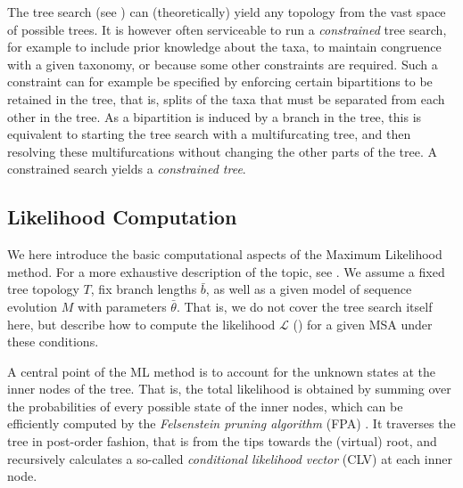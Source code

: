 The tree search (see )
can (theoretically) yield any topology from the vast space of possible trees.
It is however often serviceable to run a \emph{constrained} tree search,
for example to include prior knowledge about the taxa,
to maintain congruence with a given taxonomy, or because some other constraints are required.
Such a constraint can for example be specified by enforcing certain bipartitions to be retained in the tree,
that is, splits of the taxa that must be separated from each other in the tree.
As a bipartition is induced by a branch in the tree,
this is equivalent to starting the tree search with a multifurcating tree,
and then resolving these multifurcations without changing the other parts of the tree.
A constrained search yields a \emph{constrained tree}.



\subsection{Likelihood Computation}
\label{ch:Foundations:sec:MLTreeInference:sub:LikelihoodComputation}

We here introduce the basic computational aspects of the Maximum Likelihood method.
For a more exhaustive description of the topic, see \cite{Yang2014}.
We assume a fixed tree topology $T$, fix branch lengths $\bar{b}$,
as well as a given model of sequence evolution $M$ with parameters $\bar{\theta}$.
That is, we do not cover the tree search itself here,
but describe how to compute the likelihood $\mathcal{L}$
() for a given MSA under these conditions.

A central point of the ML method is to account for the unknown states at the inner nodes of the tree.
That is, the total likelihood is obtained by summing over the probabilities of every possible state of the inner nodes,
which can be efficiently computed by the \emph{Felsenstein pruning algorithm} (FPA) \cite{Felsenstein1981}.
It traverses the tree in post-order fashion, that is from the tips towards the (virtual) root,
and recursively calculates a so-called \emph{conditional likelihood vector} (CLV) at each inner node.

